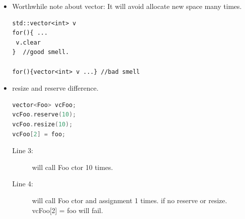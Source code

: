 \documentclass[a4paper,11pt,twoside]{book}
\begin{document}
\begin{itemize}
\item Worthwhile note about vector: It will avoid allocate new space many times.
\begin{lstlisting}[numbers=none]
std::vector<int> v
for(){ ...
 v.clear
}  //good smell.

for(){vector<int> v ...} //bad smell
\end{lstlisting}
\item resize and reserve difference.
\begin{lstlisting}[frame=single, language=c++]
vector<Foo> vcFoo;
vcFoo.reserve(10);
vcFoo.resize(10); 
vcFoo[2] = foo; 
\end{lstlisting}
\begin{description}
	\item[Line 3:] will call Foo ctor 10 times.
	\item[Line 4:] will call Foo ctor and assignment 1 times. if no reserve or resize. vcFoo[2] = foo will fail.
\end{description}


\end{itemize}
\end{document}

